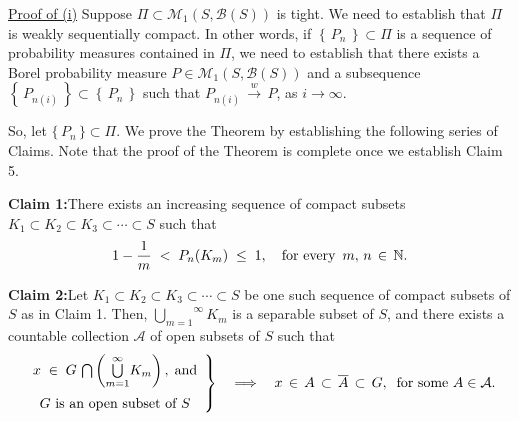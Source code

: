 \vskip 0.3cm
\noindent
\underline{Proof of (i)}
\vskip 0.2cm
\noindent
Suppose $\Pi \subset \mathcal{M}_{1}(S,\mathcal{B}(S))$ is tight.
We need to establish that $\Pi$ is weakly sequentially compact.
In other words, if $\left\{\,P_{n}\,\right\} \subset \Pi$ is a sequence of probability measures contained in $\Pi$,
we need to establish that there exists a Borel probability measure
$P \in \mathcal{M}_{1}(S,\mathcal{B}(S))$ and a subsequence
$\left\{\,P_{n(i)}\,\right\} \subset \left\{\,P_{n}\,\right\}$
such that $P_{n(i)}\,\overset{w}{\longrightarrow}\,P$, as $i \longrightarrow \infty$.

\vskip 0.5cm
\noindent
So, let $\{\,P_{n}\,\} \subset \Pi$.
We prove the Theorem by establishing the following series of Claims.
Note that the proof of the Theorem is complete once we establish Claim 5.

\vskip 0.5cm
\begin{center}
\begin{minipage}{6.5in}
\textbf{Claim 1:}\quad There exists an increasing sequence of compact subsets
$K_{1} \subset K_{2} \subset K_{3} \subset \cdots \subset S$ such that
\begin{equation*}
1 - \dfrac{1}{m} \; < \; P_{n}(K_{m}) \; \leq \; 1,
\quad
\textnormal{for every \,$m, \,n \,\in\, \mathbb{N}$}.
\end{equation*}
\end{minipage}
\end{center}

\vskip 0.5cm
\begin{center}
\begin{minipage}{6.5in}
\textbf{Claim 2:}\quad Let  $K_{1} \subset K_{2} \subset K_{3} \subset \cdots \subset S$
be one such sequence of compact subsets of $S$ as in Claim 1.
Then, $\overset{\infty}{\underset{m=1}{\bigcup}}K_{m}$ is a separable subset of $S$, and
there exists a countable collection $\mathcal{A}$ of open subsets of $S$
such that
\begin{equation*}
\left.
\begin{array}{c}
x \; \in \; G\,\bigcap\left(\overset{\infty}{\underset{m=1}{\bigcup}}K_{m}\right), \;\textnormal{and} \\
\textnormal{$G$ is an $\overset{{\color{white}1}}{\textnormal{open subset}}$ of $S$}
\end{array}
\right\}
\quad
\Longrightarrow
\quad
x \,\in\, A \,\subset\, \overline{A} \,\subset\, G,
\;\;\textnormal{for some $A \in \mathcal{A}$}.
\end{equation*} 
\end{minipage}
\end{center}

